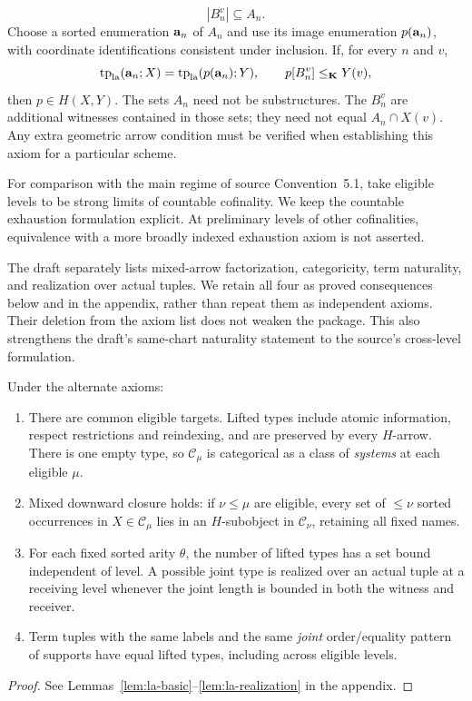 \begin{definition}
\begin{enumerate}[label=\textup{(A\arabic*)},leftmargin=*]
\[ |B^v_n|\subseteq A_n.
\]
Choose a sorted enumeration $\mathbf{a}_n$ of $A_n$ and use its image enumeration
$p(\mathbf{a}_n)$, with coordinate identifications consistent under inclusion.
If, for every $n$ and $v$,
\[
 \operatorname{tp}_{\mathrm{la}}(\mathbf{a}_n;X)=
 \operatorname{tp}_{\mathrm{la}}(p(\mathbf{a}_n);Y),\qquad
 p[B^v_n]\leq_\mathbf K Y(v),
\]
then $p\in H(X,Y)$. The sets $A_n$ need not be substructures.
The $B^v_n$ are additional witnesses contained in those sets; they need
not equal $A_n\cap X(v)$. Any extra geometric arrow condition must be
verified when establishing this axiom for a particular scheme.
\end{enumerate}
For comparison with the main regime of source Convention~5.1, take
eligible levels to be strong limits of countable cofinality. We keep
the countable exhaustion formulation explicit. At preliminary levels
of other cofinalities, equivalence with a more broadly indexed exhaustion
axiom is not asserted.
\end{definition}

\begin{remark}
The draft separately lists mixed-arrow factorization, categoricity,
term naturality, and realization over actual tuples. We retain all four
as proved consequences below and in the appendix, rather than repeat
them as independent axioms. Their deletion from the axiom list does not
weaken the package. This also strengthens the draft's same-chart
naturality statement to the source's cross-level formulation.
\end{remark}

\begin{proposition}\label{prop:alternate-derived}
Under the alternate axioms:
\begin{enumerate}[label=\textup{(\roman*)},leftmargin=*]
\item There are common eligible targets. Lifted types include atomic
information, respect restrictions and reindexing, and are preserved by
every $H$-arrow. There is one empty type, so $\mathcal C_\mu$ is categorical
as a class of \emph{systems} at each eligible $\mu$.
\item Mixed downward closure holds: if $\nu\leq\mu$ are eligible,
every set of $\leq\nu$ sorted occurrences in $X\in\mathcal C_\mu$ lies
in an $H$-subobject in $\mathcal C_\nu$, retaining all fixed names.
\item For each fixed sorted arity $\theta$, the number of lifted types
has a set bound independent of level. A possible joint type is realized
over an actual tuple at a receiving level whenever the joint length is
bounded in both the witness and receiver.
\item Term tuples with the same labels and the same \emph{joint}
order/equality pattern of supports have equal lifted types, including
across eligible levels.
\end{enumerate}
\end{proposition}
\begin{proof}
See Lemmas~\ref{lem:la-basic}--\ref{lem:la-realization} in the appendix.
\end{proof}

